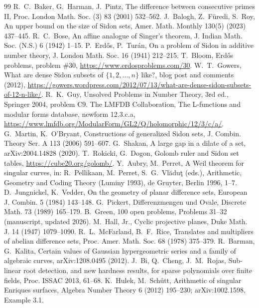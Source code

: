 \documentclass[11pt]{article}
\begin{document}
\begin{thebibliography}{99}
 R.~C.~Baker, G.~Harman, J.~Pintz, The difference between consecutive primes II, Proc. London Math. Soc. (3) 83 (2001) 532--562.
 J.~Balogh, Z.~F\"uredi, S.~Roy, An upper bound on the size of Sidon sets, Amer. Math. Monthly 130(5) (2023) 437--445.
 R.~C.~Bose, An affine analogue of Singer's theorem, J. Indian Math. Soc. (N.S.) 6 (1942) 1--15.
 P.~Erd\H{o}s, P.~Tur\'an, On a problem of Sidon in additive number theory, J. London Math. Soc. 16 (1941) 212--215.
 T.~Bloom, Erd\H{o}s problems, problem \#30, \url{https://www.erdosproblems.com/30}.
 W.~T.~Gowers, What are dense Sidon subsets of $\{1,2,\dots,n\}$ like?, blog post and comments (2012),
\url{https://gowers.wordpress.com/2012/07/13/what-are-dense-sidon-subsets-of-12-n-like/}.
 R.~K.~Guy, Unsolved Problems in Number Theory, 3rd ed., Springer 2004, problem C9.
 The LMFDB Collaboration, The L-functions and modular forms database, newform 12.3.c.a, \url{https://www.lmfdb.org/ModularForm/GL2/Q/holomorphic/12/3/c/a/}.
 G.~Martin, K.~O'Bryant, Constructions of generalized Sidon sets, J. Combin. Theory Ser. A 113 (2006) 591--607.
 G.~Shakan, A large gap in a dilate of a set, arXiv:2004.14828 (2020).
 T.~Rokicki, G.~Dogon, Golomb ruler and Sidon set tables, \url{https://cube20.org/golomb/}.
 Y.~Aubry, M.~Perret, A Weil theorem for singular curves, in: R.~Pellikaan, M.~Perret, S.~G.~Vl\u{a}du\c{t} (eds.), Arithmetic, Geometry and Coding Theory (Luminy 1993), de Gruyter, Berlin 1996, 1--7.
 D.~Jungnickel, K.~Vedder, On the geometry of planar difference sets, European J. Combin. 5 (1984) 143--148.
 G.~Pickert, Differenzmengen und Ovale, Discrete Math. 73 (1989) 165--179.
 B.~Green, 100 open problems, Problems 31--32 (manuscript, updated 2026).
 M.~Hall, Jr., Cyclic projective planes, Duke Math. J. 14 (1947) 1079--1090.
 R.~L.~McFarland, B.~F.~Rice, Translates and multipliers of abelian difference sets, Proc. Amer. Math. Soc. 68 (1978) 375--379.
 R.~Barman, G.~Kalita, Certain values of Gaussian hypergeometric series and a family of algebraic curves, arXiv:1208.0495 (2012).
 J.~Bi, Q.~Cheng, J.~M.~Rojas, Sub-linear root detection, and new hardness results, for sparse polynomials over finite fields, Proc. ISSAC 2013, 61--68.
 K.~Hulek, M.~Sch\"utt, Arithmetic of singular Enriques surfaces, Algebra Number Theory 6 (2012) 195--230; arXiv:1002.1598, Example 3.1.

\end{thebibliography}
\end{document}
